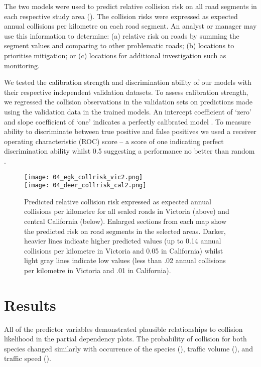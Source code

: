The two models were used to predict relative collision risk on all road segments in each respective study area (). The collision risks were expressed as expected annual collisions per kilometre on each road segment. An analyst or manager may use this information to determine: (a) relative risk on roads by summing the segment values and comparing to other problematic roads; (b) locations to prioritise mitigation; or (c) locations for additional investigation such as monitoring.

We tested the calibration strength and discrimination ability of our models with their respective independent validation datasets. To assess calibration strength, we regressed the collision observations in the validation sets on predictions made using the validation data in the trained models. An intercept coefficient of `zero' and slope coefficient of `one' indicates a perfectly calibrated model \citep[see][]{mill91}. To measure ability to discriminate between true positive and false positives we used a receiver operating characteristic (ROC) score -- a score of one indicating perfect discrimination ability whilst 0.5 suggesting a performance no better than random \citep[see][]{metz78}.

\begin{figure*}[!t]
  \centering
  \texttt{[image: 04\_egk\_collrisk\_vic2.png]}\\
  \texttt{[image: 04\_deer\_collrisk\_cal2.png]}
  \caption[Predicted relative collision risk for all sealed roads in Victoria and central California]{Predicted relative collision risk expressed as expected annual collisions per kilometre for all sealed roads in Victoria (above) and central California (below).  Enlarged sections from each map show the predicted risk on road segments in the selected areas. Darker, heavier lines indicate higher predicted values (up to 0.14 annual collisions per kilometre in Victoria and 0.05 in California) whilst light gray lines indicate low values (less than .02 annual collisions per kilometre in Victoria and .01 in California).}
  \label{cal_coll_preds}
\end{figure*}

\section{Results}

All of the predictor variables demonstrated plausible relationships to collision likelihood in the partial dependency plots. The probability of collision for both species changed similarly with occurrence of the species (), traffic volume (), and traffic speed ().

